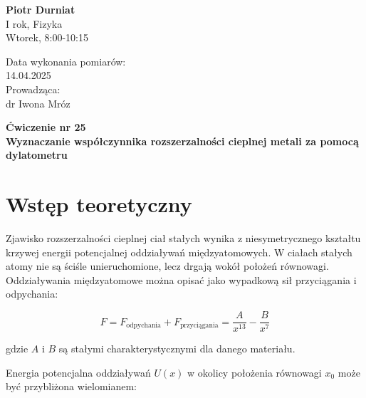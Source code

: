 \documentclass[a4paper,12pt]{article}
\begin{document}
\noindent
\begin{minipage}{0.5\textwidth}
    \raggedright
    \textbf{Piotr Durniat} \\
    I rok, Fizyka \\
    Wtorek, 8:00-10:15 \\
    \vspace{0.5cm}
    \vspace{0.5cm}
\end{minipage}%
\begin{minipage}{0.5\textwidth}
    \raggedleft
    Data wykonania pomiarów: \\
    14.04.2025 \\
    \vspace{0.5cm} %
    Prowadząca: \\
    dr Iwona Mróz
\end{minipage}

\vspace{2cm} %
\begin{center}
    \LARGE \textbf{Ćwiczenie nr 25} \\[0.5cm]
    \Large \textbf{Wyznaczanie współczynnika rozszerzalności cieplnej metali za pomocą dylatometru}
\end{center}

\vspace{1cm} %
\noindent

\tableofcontents
\newpage

\section{Wstęp teoretyczny}

Zjawisko rozszerzalności cieplnej ciał stałych wynika z niesymetrycznego kształtu krzywej energii potencjalnej oddziaływań międzyatomowych. W ciałach stałych atomy nie są ściśle unieruchomione, lecz drgają wokół położeń równowagi. Oddziaływania międzyatomowe można opisać jako wypadkową sił przyciągania i odpychania:

\begin{equation}
    F = F_{\text{odpychania}} + F_{\text{przyciągania}} = \frac{A}{x^{13}} - \frac{B}{x^7}
\end{equation}

gdzie $A$ i $B$ są stałymi charakterystycznymi dla danego materiału.

Energia potencjalna oddziaływań $U(x)$ w okolicy położenia równowagi $x_0$ może być przybliżona wielomianem:
\end{document}
